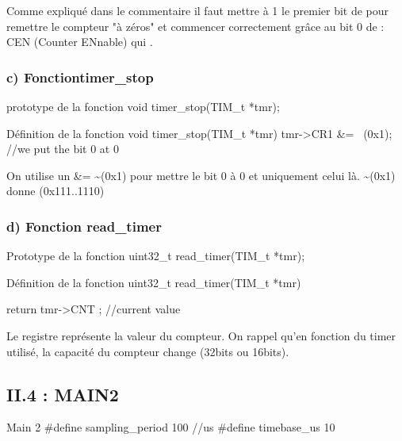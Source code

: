 {Comme expliqué dans le commentaire il faut mettre à 1 le premier bit de  pour remettre le compteur "à zéros" et commencer correctement grâce au bit 0 de  : CEN (Counter ENnable) qui .





\subsubsection{c) Fonctiontimer\_stop}
\begin{Cpp}{prototype de la fonction } 
void timer_stop(TIM_t *tmr);
\end{Cpp}

\begin{Cpp}{Définition de la fonction } 
void timer_stop(TIM_t *tmr) {
    tmr->CR1 &= ~(0x1);  //we put the bit 0 at 0 
}
\end{Cpp}

On utilise un \&= \~{}(0x1) pour mettre le bit 0 à 0 et uniquement celui là.
\~{}(0x1) donne (0x111..1110)\\





\subsubsection{d) Fonction read\_timer}
\begin{Cpp}{Prototype de la fonction} 
uint32_t read_timer(TIM_t *tmr);
\end{Cpp}

\begin{Cpp}{Définition de la fonction} 
uint32_t read_timer(TIM_t *tmr) {

	return tmr->CNT ;	//current value
}
\end{Cpp}

Le registre  représente la valeur du compteur. On rappel qu'en fonction du timer utilisé, la capacité du compteur change (32bits ou 16bits).


\newpage
\subsection{II.4 : MAIN2}
\begin{Cpp}{Main 2} 
#define sampling_period 100         //us
#define timebase_us     10


\end{Cpp}}
